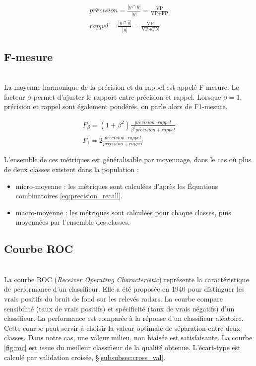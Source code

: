 \begin{equation} \label{eq:precision_recall}
\begin{split}
pr\acute{e}cision = \frac{|y \cap \hat{y}|}{|y|} = \frac{\text{VP}}{\text{VP}+\text{FP}}
\\
rappel = \frac{|y \cap \hat{y}|}{|\hat{y}|} = \frac{\text{VP}}{\text{VP}+\text{FN}}
\end{split}
\end{equation}

\subsection{F-mesure}\mbox{} \\
La moyenne harmonique de la précision et du rappel est appelé F-mesure.
Le facteur $\beta$ permet d'ajuster le rapport entre précision et rappel.
Lorsque $\beta = 1$, précision et rappel sont également pondérés, on parle alors de F1-mesure.

\begin{equation} \label{eq:f1_score}
\begin{split}
F_{\beta}=\left(1+\beta^{2}\right) \frac{pr\acute{e}cision \cdot rappel}{\beta^{2} pr\acute{e}cision + rappel}
\\
F_{1}= 2 \frac{pr\acute{e}cision \cdot rappel}{pr\acute{e}cision + rappel}
\end{split}
\end{equation}

L'ensemble de ces métriques est généralisable par moyennage, dans le cas où plus de deux classes existent dans la population :
\begin{itemize}
	\item micro-moyenne : les métriques sont calculées d'après les Équations combinatoires \ref{eq:precision_recall}.
	\item macro-moyenne : les métriques sont calculées pour chaque classes, puis moyennées par l'ensemble des classes.
\end{itemize}

\subsection{Courbe ROC}\mbox{} \label{subsec:roc} \\
La courbe ROC (\textit{Receiver Operating Characteristic}) représente la caractéristique de performance d'un classifieur.
Elle a été proposée en 1940 pour distinguer les vrais positifs du bruit de fond sur les relevés radars.
La courbe compare sensibilité (taux de vrais positifs) et spécificité (taux de vrais négatifs) d'un classifieur.
La performance est comparée à la réponse d'un classifieur aléatoire.
Cette courbe peut servir à choisir la valeur optimale de séparation entre deux classes.
Dans notre cas, une valeur milieu, non biaisée est satisfaisante.
La courbe \ref{fig:roc} est issue du meilleur classifieur de la qualité obtenue.
L'écart-type est calculé par validation croisée, §\ref{subsubsec:cross_val}.

